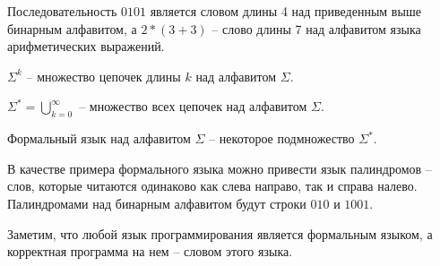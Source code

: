 Последовательность $0101$ является словом длины 4 над приведенным выше бинарным алфавитом,
а $2 * (3 + 3)$ -- слово длины 7 над алфавитом языка арифметических выражений.
\begin{definition}
$\Sigma^k$ -- множество цепочек длины $k$ над алфавитом $\Sigma$.
\end{definition}
\begin{definition}
$\Sigma^* = \bigcup\limits_{k=0}^\infty$ -- множество всех цепочек над алфавитом $\Sigma$.
\end{definition}
\begin{definition}
Формальный язык над алфавитом $\Sigma$ -- некоторое подмножество $\Sigma^*$.
\end{definition}
В качестве примера формального языка можно привести язык палиндромов -- слов, которые читаются одинаково как слева направо, так и справа налево.
Палиндромами над бинарным алфавитом будут строки $010$ и $1001$.

Заметим, что любой язык программирования является формальным языком, а корректная программа на нем -- словом этого языка.
